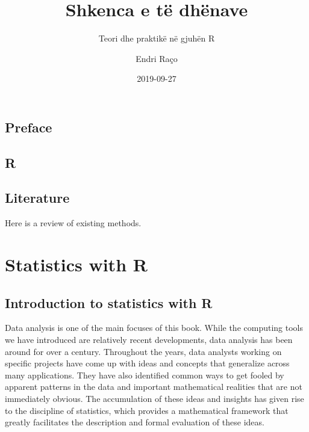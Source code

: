 \documentclass[openany]{book}
\title{Shkenca e të dhënave}
\subtitle{Teori dhe praktikë në gjuhën R}
\author{Endri Raço}
\date{2019-09-27}
\begin{document}
\maketitle

{
\setcounter{tocdepth}{1}
\tableofcontents
}
\hypertarget{preface}{%
\chapter*{Preface}\label{preface}}

\hypertarget{r}{%
\chapter{R}\label{r}}

\hypertarget{literature}{%
\chapter{Literature}\label{literature}}

Here is a review of existing methods.

\hypertarget{part-statistics-with-r}{%
\part{Statistics with R}\label{part-statistics-with-r}}

\hypertarget{introduction-to-statistics-with-r}{%
\chapter{Introduction to statistics with R}\label{introduction-to-statistics-with-r}}

Data analysis is one of the main focuses of this book. While the computing tools we have introduced are relatively recent developments, data analysis has been around for over a century. Throughout the years, data analysts working on specific projects have come up with ideas and concepts that generalize across many applications. They have also identified common ways to get fooled by apparent patterns in the data and important mathematical realities that are not immediately obvious. The accumulation of these ideas and insights has given rise to the discipline of statistics, which provides a mathematical framework that greatly facilitates the description and formal evaluation of these ideas.
\end{document}
